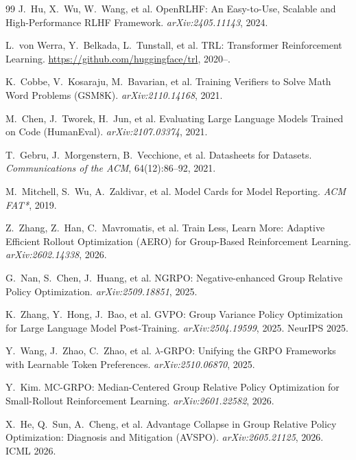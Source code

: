 \begin{thebibliography}{99}
J.~Hu, X.~Wu, W.~Wang, et al.
\newblock OpenRLHF: An Easy-to-Use, Scalable and High-Performance RLHF Framework.
\newblock \emph{arXiv:2405.11143}, 2024.

L.~von Werra, Y.~Belkada, L.~Tunstall, et al.
\newblock TRL: Transformer Reinforcement Learning.
\newblock \url{https://github.com/huggingface/trl}, 2020--.

K.~Cobbe, V.~Kosaraju, M.~Bavarian, et al.
\newblock Training Verifiers to Solve Math Word Problems (GSM8K).
\newblock \emph{arXiv:2110.14168}, 2021.

M.~Chen, J.~Tworek, H.~Jun, et al.
\newblock Evaluating Large Language Models Trained on Code (HumanEval).
\newblock \emph{arXiv:2107.03374}, 2021.

T.~Gebru, J.~Morgenstern, B.~Vecchione, et al.
\newblock Datasheets for Datasets.
\newblock \emph{Communications of the ACM}, 64(12):86--92, 2021.

M.~Mitchell, S.~Wu, A.~Zaldivar, et al.
\newblock Model Cards for Model Reporting.
\newblock \emph{ACM FAT*}, 2019.

Z.~Zhang, Z.~Han, C.~Mavromatis, et al.
\newblock Train Less, Learn More: Adaptive Efficient Rollout Optimization (AERO) for Group-Based Reinforcement Learning.
\newblock \emph{arXiv:2602.14338}, 2026.

G.~Nan, S.~Chen, J.~Huang, et al.
\newblock NGRPO: Negative-enhanced Group Relative Policy Optimization.
\newblock \emph{arXiv:2509.18851}, 2025.

K.~Zhang, Y.~Hong, J.~Bao, et al.
\newblock GVPO: Group Variance Policy Optimization for Large Language Model Post-Training.
\newblock \emph{arXiv:2504.19599}, 2025. NeurIPS 2025.

Y.~Wang, J.~Zhao, C.~Zhao, et al.
\newblock $\lambda$-GRPO: Unifying the GRPO Frameworks with Learnable Token Preferences.
\newblock \emph{arXiv:2510.06870}, 2025.

Y.~Kim.
\newblock MC-GRPO: Median-Centered Group Relative Policy Optimization for Small-Rollout Reinforcement Learning.
\newblock \emph{arXiv:2601.22582}, 2026.

X.~He, Q.~Sun, A.~Cheng, et al.
\newblock Advantage Collapse in Group Relative Policy Optimization: Diagnosis and Mitigation (AVSPO).
\newblock \emph{arXiv:2605.21125}, 2026. ICML 2026.

\end{thebibliography}

